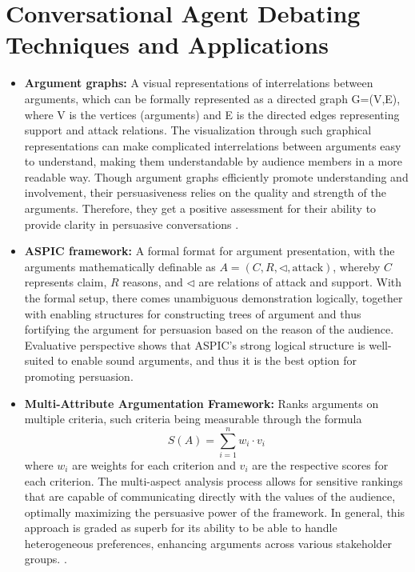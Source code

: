 \documentclass[conference]{IEEEtran}
\begin{document}
\section{Conversational Agent Debating Techniques and Applications}
\begin{itemize}
    \item \textbf{Argument graphs:} A visual representations of interrelations between arguments, which can be formally represented as a directed graph G=(V,E), where V is the vertices (arguments) and E is the directed edges representing support and attack relations. The visualization through such graphical representations can make complicated interrelations between arguments easy to understand, making them understandable by audience members in a more readable way. Though argument graphs efficiently promote understanding and involvement, their persuasiveness relies on the quality and strength of the arguments. Therefore, they get a positive assessment for their ability to provide clarity in persuasive conversations \cite{b4}\cite{b6}.

    \item \textbf{ASPIC framework:} A formal format for argument presentation, with the arguments mathematically definable as \( A = (C,R,\lhd ,\text{attack}) \), whereby \( C \) represents claim, \( R \) reasons, and \( \lhd \) are relations of attack and support. With the formal setup, there comes unambiguous demonstration logically, together with enabling structures for constructing trees of argument and thus fortifying the argument for persuasion based on the reason of the audience. Evaluative perspective shows that ASPIC's strong logical structure is well-suited to enable sound arguments, and thus it is the best option for promoting persuasion. \cite{b6}

    \item \textbf{Multi-Attribute Argumentation Framework:} 
    Ranks arguments on multiple criteria, such criteria being measurable through the formula 
    \[
    S(A) = \sum_{i=1}^{n} w_i \cdot v_i
    \]
    where \( w_i \) are weights for each criterion and \( v_i \) are the respective scores for each criterion. The multi-aspect analysis process allows for sensitive rankings that are capable of communicating directly with the values of the audience, optimally maximizing the persuasive power of the framework. In general, this approach is graded as superb for its ability to be able to handle heterogeneous preferences, enhancing arguments across various stakeholder groups. \cite{b6}.
    
\end{itemize}
\end{document}
